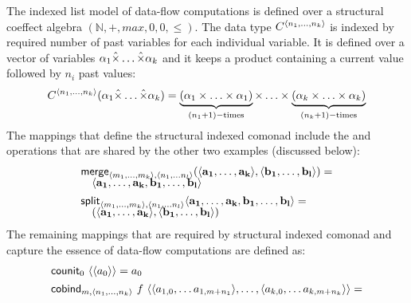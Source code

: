\begin{example}
\label{ex:struct-dfl}
The indexed list model of data-flow computations is defined over a structural coeffect
algebra $(\mathbb{N}, +, \mathit{max}, 0, 0, \leq)$. The data type $\ctyp{\langle n_1, \ldots, n_k\rangle}$
is indexed by required number of past variables for each individual variable. It is defined
over a vector of variables $\alpha_1 \hat{\times} \ldots \hat{\times} \alpha_k$ and it keeps a product
containing a current value followed by $n_i$ past values:
%
\begin{equation*}
C^{\langle n_1, \ldots, n_k\rangle}(\alpha_1 \hat{\times} \ldots \hat{\times} \alpha_k) = 
\underbrace{(\alpha_1 \times \ldots \times \alpha_1)}_{(n_1+1)-\textnormal{times}} \times \ldots \times
  \underbrace{(\alpha_k \times \ldots \times \alpha_k)}_{(n_k+1)-\textnormal{times}}
\end{equation*}
%
The mappings that define the structural indexed comonad include the  and 
operations that are shared by the other two examples (discussed below):
%
\begin{equation*}
\begin{array}{l}
\textnormal{\sffamily merge}_{\langle m_1, \ldots, m_k \rangle, \langle n_1, \ldots n_l \rangle} 
  (\langle \mathbf{a_1}, \ldots, \mathbf{a_k} \rangle, \langle \mathbf{b_1}, \ldots, \mathbf{b_l}\rangle) = \\[-0.25em]
\quad \langle \mathbf{a_1}, \ldots, \mathbf{a_k}, \mathbf{b_1}, \ldots, \mathbf{b_l}\rangle
\\[0.45em]
\textnormal{\sffamily split}_{\langle m_1, \ldots, m_k \rangle, \langle n_1, \ldots n_l \rangle} 
   \langle \mathbf{a_1}, \ldots, \mathbf{a_k}, \mathbf{b_1}, \ldots, \mathbf{b_l}\rangle = \\[-0.25em]
\quad (\langle \mathbf{a_1}, \ldots, \mathbf{a_k} \rangle, \langle \mathbf{b_1}, \ldots, \mathbf{b_l}\rangle)
\end{array}
\end{equation*}
%
The remaining mappings that are required by structural indexed comonad and capture the
essence of data-flow computations are defined as:
%
\begin{equation*}
\begin{array}{l}
\textnormal{\sffamily counit}_{0}~\langle \langle a_0 \rangle \rangle = a_0
\\[0.45em]
\textnormal{\sffamily cobind}_{m, \langle n_1, \ldots, n_k \rangle}~f~
  \langle \langle a_{1,0}, \ldots a_{1,m+{n_1}} \rangle, \ldots, \langle a_{k,0}, \ldots a_{k,m+{n_k}} \rangle \rangle = \\[-0.25em]

\end{array}
\end{equation*}
\end{example}
